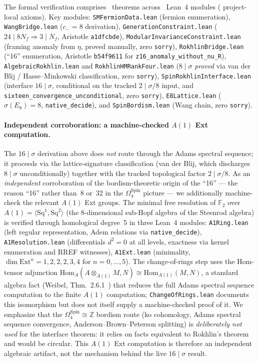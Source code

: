 \documentclass[aps,prl,twocolumn,superscriptaddress]{revtex4-2}
\begin{document}
The formal verification comprises \totaltheorems{}~theorems across
\leanmodules{}~Lean~4 modules (\axiomcount{} project-local axioms). Key modules:
\texttt{SMFermionData.lean} (fermion enumeration),
\texttt{WangBridge.lean} ($c_- = 8$ derivation),
\texttt{GenerationConstraint.lean} ($24 \mid 8N_f \Rightarrow 3 \mid N_f$,
Aristotle \texttt{a1dfcbde}),
\texttt{ModularInvarianceConstraint.lean} (framing anomaly from $\eta$,
proved manually, zero \texttt{sorry}),
\texttt{RokhlinBridge.lean} (``16'' enumeration,
Aristotle \texttt{b54f9611} for \texttt{z16\_anomaly\_without\_nu\_R}),
\texttt{AlgebraicRokhlin.lean} and \texttt{RokhlinHMRankFour.lean}
($8 \mid \sigma$ \emph{proved} via van der Blij / Hasse--Minkowski
classification, zero \texttt{sorry}),
\texttt{SpinRokhlinInterface.lean} (interface $16 \mid \sigma$, conditional
on the tracked $2 \mid \sigma/8$ input, and
\texttt{sixteen\_convergence\_unconditional}, zero \texttt{sorry}),
\texttt{E8Lattice.lean} ($\sigma(E_8) = 8$, \texttt{native\_decide}),
and \texttt{SpinBordism.lean} (Wang chain, zero \texttt{sorry}).

\paragraph{Independent corroboration: a machine-checked $A(1)$ Ext computation.}
The $16 \mid \sigma$ derivation above does \emph{not} route
through the Adams spectral sequence; it proceeds via the lattice-signature
classification (van der Blij, which discharges $8 \mid \sigma$
unconditionally) together with the tracked topological factor
$2 \mid \sigma/8$.
As an \emph{independent} corroboration of the bordism-theoretic origin of
the ``16'' --- the reason ``16'' rather than~8 or~32 in the
$\Omega^{\mathrm{Spin}}_4$ picture --- we additionally machine-check the
relevant $A(1)$ Ext groups.
The minimal free resolution of $\mathbb{F}_2$ over $A(1) = \langle \mathrm{Sq}^1, \mathrm{Sq}^2 \rangle$
(the 8-dimensional sub-Hopf algebra of the Steenrod algebra) is verified
through homological degree~5 in three Lean~4 modules:
\texttt{A1Ring.lean} (left regular representation, Adem relations via \texttt{native\_decide}),
\texttt{A1Resolution.lean} (differentials $d^2=0$ at all levels,
exactness via kernel enumeration and RREF witnesses),
\texttt{A1Ext.lean} (minimality, $\dim \mathrm{Ext}^n = 1,2,2,2,3,4$ for $n=0,\ldots,5$).
The change-of-rings step uses the Hom-tensor adjunction
$\mathrm{Hom}_A(A \otimes_{A(1)} M, N) \cong \mathrm{Hom}_{A(1)}(M, N)$,
a standard algebra fact (Weibel, Thm.~2.6.1~\cite{Weibel1994}) that
reduces the full Adams spectral sequence computation to the finite $A(1)$
computation; \texttt{ChangeOfRings.lean} documents this isomorphism but does
not itself supply a machine-checked proof of it. We emphasize that the
$\Omega^{\mathrm{Spin}}_4 \cong \mathbb{Z}$ bordism route (ko cohomology,
Adams spectral sequence convergence, Anderson--Brown--Peterson splitting)
is \emph{deliberately not used} for the interface theorem: it relies on
facts equivalent to Rokhlin's theorem and would be circular. This $A(1)$
Ext computation is therefore an independent algebraic artifact, not the
mechanism behind the live $16 \mid \sigma$ result.
\end{document}
